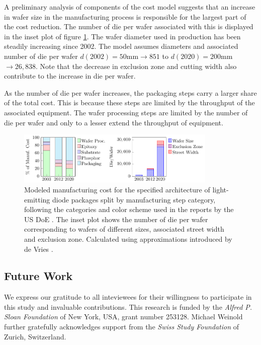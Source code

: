 \documentclass[a4paper,nocompress]{spie}  %
\begin{document}
    A preliminary analysis of components of the cost model suggests that an increase in wafer size in the manufacturing process is responsible for the largest part of the cost reduction. The number of die per wafer associated with this is displayed in the inset plot of figure \ref{fig:cost}. The wafer diameter used in production has been steadily increasing since 2002. The model assumes diameters and associated number of die per wafer  $d(2002)=50$mm$\rightarrow851$ to $d(2020)=200$mm$\rightarrow26,838$. Note that the decrease in exclusion zone and cutting width also contribute to the increase in die per wafer.
    
    As the number of die per wafer increases, the packaging steps carry a larger share of the total cost. This is because these steps are limited by the throughput of the associated equipment. The wafer processing steps are limited by the number of die per wafer and only to a lesser extend the throughput of equipment.

\begin{figure} [ht]
    \begin{center}
        \includegraphics[width=0.85\textwidth]{SPIE/article/costmodel_calibration.pdf}
    \end{center}
    \caption{Modeled manufacturing cost for the specified architecture of light-emitting diode packages split by manufacturing step category, following the categories and color scheme used in the reports by the US DoE \cite{doe2016solid}. The inset plot shows the number of die per wafer corresponding to wafers of different sizes, associated street width and exclusion zone. Calculated using approximations introduced by de Vries \cite{deVries2005}.}
    \label{fig:cost}
\end{figure}

    \subsection{Future Work}


\acknowledgments %

We express our gratitude to all inteviewees for their willingness to participate in this study and invaluable contributions. This research is funded by the \textit{Alfred P. Sloan Foundation} of New York, USA, grant number 253128. Michael Weinold further gratefully acknowledges support from the \textit{Swiss Study Foundation} of Zurich, Switzerland.


\clearpage
\end{document}
